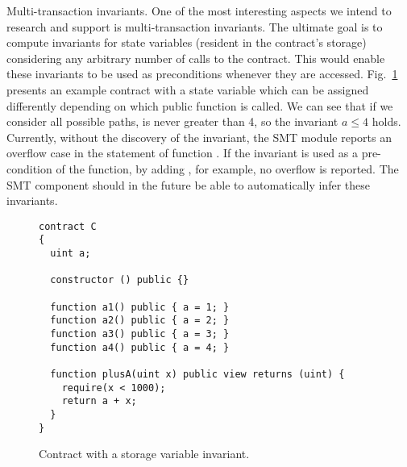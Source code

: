 \begin{paragraph}{Multi-transaction invariants.}
One of the most interesting aspects we intend to research and support is
multi-transaction invariants.
%
The ultimate goal is to compute invariants for state variables (resident in the
contract's storage) considering any arbitrary number of calls to the contract.
%
This would enable these invariants to be used as preconditions whenever they
are accessed.
%
Fig.~\ref{fig:invariant_a} presents an example contract with a state variable
 which can be assigned differently depending on which public function
is called.
%
We can see that if we consider all possible paths,  is never greater
than 4, so the invariant $a \le 4$ holds.
%
Currently, without the discovery of the invariant, the SMT module reports an
overflow case in the  statement of function .
%
If the invariant is used as a pre-condition of the function, by adding
, for example, no overflow is reported.
%
The SMT component should in the future be able to automatically infer these
invariants.

\begin{figure}
\begin{verbatim}
contract C
{
  uint a;

  constructor () public {}

  function a1() public { a = 1; }
  function a2() public { a = 2; }
  function a3() public { a = 3; }
  function a4() public { a = 4; }

  function plusA(uint x) public view returns (uint) {
    require(x < 1000);
    return a + x;
  }
}
\end{verbatim}
\caption{Contract with a storage variable invariant.}
\label{fig:invariant_a}
\end{figure}

\end{paragraph}

